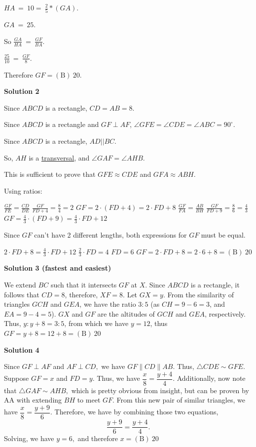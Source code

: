 \begin{enumerate}
 $HA\: =\: 10 =\: \frac{2}{5}*(GA)$. 

 $GA\: =\: 25.$

 So $\frac{GA}{HA}\: =\: \frac{GF}{BA}$.

 $\frac{25}{10}\: =\: \frac{GF}{8}$.

 Therefore   $GF= \boxed{\mathrm{(B)}\ 20}$.

 



\textbf{Solution 2}

Since $ABCD$ is a rectangle, $CD=AB=8$. 

 Since $ABCD$ is a rectangle and $GF \perp AF$,  $\angle GFE = \angle CDE = \angle ABC = 90^\circ$. 

 Since $ABCD$ is a rectangle, $AD || BC$. 

 So, $AH$ is a \href{https://artofproblemsolving.com/wiki/index.php?title=Transversal}{transversal}, and $\angle GAF = \angle AHB$. 

 This is sufficient to prove that $GFE \approx CDE$ and $GFA \approx ABH$.

 Using ratios: 

 $\frac{GF}{FE}=\frac{CD}{DE}$
$\frac{GF}{FD+4}=\frac{8}{4}=2$
$GF=2 \cdot (FD+4)=2 \cdot FD+8$
$\frac{GF}{FA}=\frac{AB}{BH}$
$\frac{GF}{FD+9}=\frac{8}{6}=\frac{4}{3}$
$GF=\frac{4}{3} \cdot (FD+9)=\frac{4}{3} \cdot FD+12$

 Since $GF$ can't have 2 different lengths, both expressions for $GF$ must be equal. 

 $2 \cdot FD+8=\frac{4}{3} \cdot FD+12$
$\frac{2}{3} \cdot FD=4$
$FD=6$
$GF=2 \cdot FD+8=2\cdot6+8=\boxed{\mathrm{(B)}\ 20}$




\textbf{Solution 3 (fastest and easiest)}

We extend $BC$ such that it intersects $GF$ at $X$. Since $ABCD$ is a rectangle, it follows that $CD=8$, therefore, $XF=8$. Let $GX=y$. From the similarity of triangles $GCH$ and $GEA$, we have the ratio $3:5$ (as $CH=9-6=3$, and $EA=9-4=5$). $GX$ and $GF$ are the altitudes of $GCH$ and $GEA$, respectively. Thus, $y:y+8 = 3:5$, from which we have $y=12$, thus $GF=y+8=12+8=\boxed{\mathrm{(B)}\ 20}$




\textbf{Solution 4}

Since $GF\perp AF$ and $AF\perp CD,$ we have $GF\parallel CD\parallel AB.$ Thus, $\triangle CDE\sim GFE.$ Suppose $GF=x$ and $FD=y.$ Thus, we have $\dfrac{x}{8}=\dfrac{y+4}{4}.$ Additionally, now note that $\triangle GAF\sim AHB,$ which is pretty obvious from insight, but can be proven by AA with extending $BH$ to meet $GF.$ From this new pair of similar triangles, we have $\dfrac{x}{8}=\dfrac{y+9}{6}.$ Therefore, we have by combining those two equations, 
 \[\dfrac{y+9}{6}=\dfrac{y+4}{4}.\] Solving, we have $y=6,$ and therefore $x=\boxed{\mathrm{(B)}\ 20}$





\end{enumerate}
